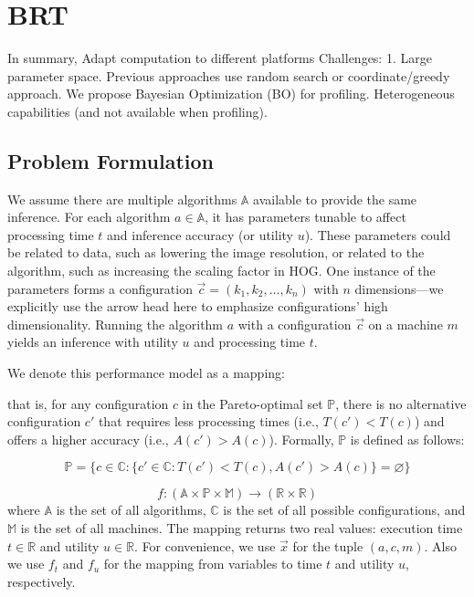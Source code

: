 \section{BRT}

In summary, Adapt computation to different platforms Challenges: 1. Large
parameter space. Previous approaches use random search or coordinate/greedy
approach. We propose Bayesian Optimization (BO) for profiling. Heterogeneous
capabilities (and not available when profiling).

\subsection{Problem Formulation}
\label{sec:problem-formulation}

We assume there are multiple algorithms $\mathbb{A}$ available to provide the
same inference. For each algorithm $a \in \mathbb{A}$, it has parameters tunable
to affect processing time $t$ and inference accuracy (or utility $u$). These
parameters could be related to data, such as lowering the image resolution, or
related to the algorithm, such as increasing the scaling factor in HOG. One
instance of the parameters forms a configuration
$\vec{c} = (k_1, k_2, \dots, k_n)$ with $n$ dimensions---we explicitly use the
arrow head here to emphasize configurations' high dimensionality. Running the
algorithm $a$ with a configuration $\vec{c}$ on a machine $m$ yields an
inference with utility $u$ and processing time $t$.

We denote this performance model as a mapping:

that is, for any configuration $c$ in the Pareto-optimal set $\mathbb{P}$, there
is no alternative configuration $c'$ that requires less processing times (i.e.,
$T(c') < T(c)$) and offers a higher accuracy (i.e., $A(c') > A(c)$). Formally,
$\mathbb{P}$ is defined as follows:

{\small \vspace{-1.2em}
  \begin{equation}
    \mathbb{P} = \{ c \in \mathbb{C} : \{ c' \in \mathbb{C}: T(c') < T(c),
    A(c') > A(c) \} = \varnothing\}
  \label{eq:pareto-2}
\end{equation}
\vspace{-1.2em}
}


{\small \vspace{-1em}
  \begin{equation*}
    f: (\mathbb{A} \times \mathbb{P} \times \mathbb{M}) \rightarrow
    (\mathbb{R}\times \mathbb{R})
\end{equation*}
} where $\mathbb{A}$ is the set of all algorithms, $\mathbb{C}$ is the set of
all possible configurations, and $\mathbb{M}$ is the set of all machines. The
mapping returns two real values: execution time $t \in \mathbb{R}$ and utility
$u \in \mathbb{R}$. For convenience, we use $\vec{x}$ for the tuple $(a, c, m)$.
Also we use $f_t$ and $f_u$ for the mapping from variables to time $t$ and
utility $u$, respectively.

